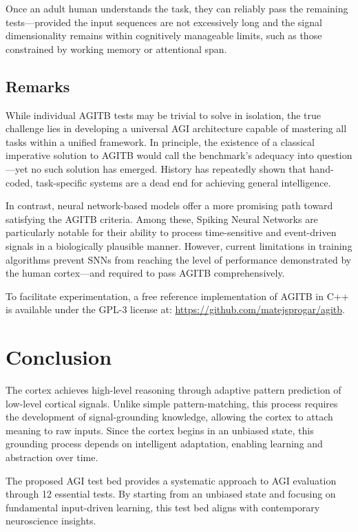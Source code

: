 \documentclass{article}
\begin{document}
Once an adult human understands the task, they can reliably pass the remaining tests—provided the input sequences are not excessively long and the signal dimensionality remains within cognitively manageable limits, such as those constrained by working memory or attentional span.

\subsection{Remarks}
While individual AGITB tests may be trivial to solve in isolation, the true challenge lies in developing a universal AGI architecture capable of mastering all tasks within a unified framework. In principle, the existence of a classical imperative solution to AGITB would call the benchmark’s adequacy into question—yet no such solution has emerged. History has repeatedly shown that hand-coded, task-specific systems are a dead end for achieving general intelligence.

In contrast, neural network-based models offer a more promising path toward satisfying the AGITB criteria. Among these, Spiking Neural Networks are particularly notable for their ability to process time-sensitive and event-driven signals in a biologically plausible manner. However, current limitations in training algorithms prevent SNNs from reaching the level of performance demonstrated by the human cortex—and required to pass AGITB comprehensively.

To facilitate experimentation, a free reference implementation of AGITB in C++ is available under the GPL-3 license at: \url{https://github.com/matejsprogar/agitb}.



\section{Conclusion}
The cortex achieves high-level reasoning through adaptive pattern prediction of low-level cortical signals. Unlike simple pattern-matching, this process requires the development of signal-grounding knowledge, allowing the cortex to attach meaning to raw inputs. Since the cortex begins in an unbiased state, this grounding process depends on intelligent adaptation, enabling learning and abstraction over time.

The proposed AGI test bed provides a systematic approach to AGI evaluation through 12 essential tests. By starting from an unbiased state and focusing on fundamental input-driven learning, this test bed aligns with contemporary neuroscience insights.
\end{document}
